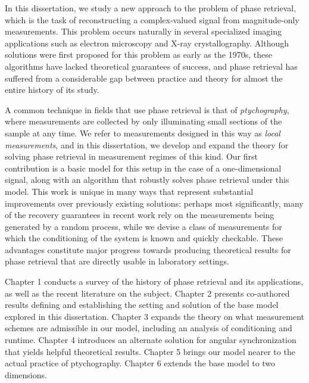 In this dissertation, we study a new approach to the problem of phase retrieval, which is the task of reconstructing a complex-valued signal from magnitude-only measurements.  This problem occurs naturally in several specialized imaging applications such as electron microscopy and X-ray crystallography.  Although solutions were first proposed for this problem as early as the 1970s, these algorithms have lacked theoretical guarantees of success, and phase retrieval has suffered from a considerable gap between practice and theory for almost the entire history of its study.

A common technique in fields that use phase retrieval is that of \emph{ptychography}, where measurements are collected by only illuminating small sections of the sample at any time.  We refer to measurements designed in this way as \emph{local measurements}, and in this dissertation, we develop and expand the theory for solving phase retrieval in measurement regimes of this kind.  Our first contribution is a basic model for this setup in the case of a one-dimensional signal, along with an algorithm that robustly solves phase retrieval under this model.  This work is unique in many ways that represent substantial improvements over previously existing solutions: perhaps most significantly, many of the recovery guarantees in recent work rely on the measurements being generated by a random process, while we devise a class of measurements for which the conditioning of the system is known and quickly checkable.  These advantages constitute major progress towards producing theoretical results for phase retrieval that are directly usable in laboratory settings.

Chapter 1 conducts a survey of the history of phase retrieval and its applications, as well as the recent literature on the subject.  Chapter 2 presents co-authored results defining and establishing the setting and solution of the base model explored in this dissertation.  Chapter 3 expands the theory on what measurement schemes are admissible in our model, including an analysis of conditioning and runtime.  Chapter 4 introduces an alternate solution for angular synchronization that yields helpful theoretical results.  Chapter 5 brings our model nearer to the actual practice of ptychography.  Chapter 6 extends the base model to two dimensions.
